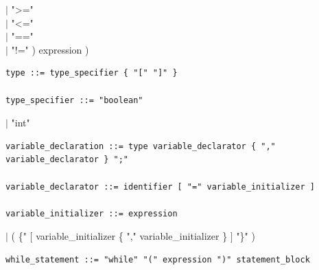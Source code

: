 \documentclass[10pt,a4paper,titlepage]{article}
\begin{document}
					\hspace*{7cm}$\mid$ ">=" \\
					\hspace*{7cm}$\mid$ "<=" \\
					\hspace*{7cm}$\mid$ "==" \\
					\hspace*{7cm}$\mid$ "!=" ) expression ) 
\begin{verbatim}
type ::= type_specifier { "[" "]" } 

type_specifier ::= "boolean" 
\end{verbatim}
		\hspace*{3.8cm}$\mid$ "int" 
\begin{verbatim}
variable_declaration ::= type variable_declarator { "," variable_declarator } ";" 

variable_declarator ::= identifier [ "=" variable_initializer ] 

variable_initializer ::= expression
\end{verbatim}
		\hspace*{4.8cm}$\mid$ ( \{" $[$ variable\_initializer \{ "," variable\_initializer \} $]$ "\}" ) 
\begin{verbatim}
while_statement ::= "while" "(" expression ")" statement_block 
\end{verbatim}
\end{document}
